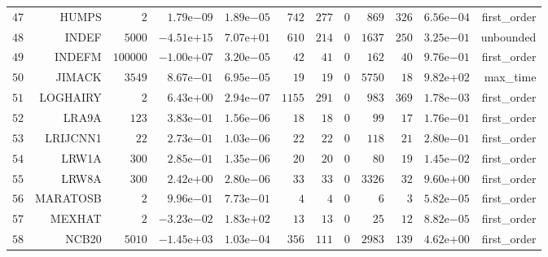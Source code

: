 \begin{longtable}{rrrrrrrrrrrr}
  \(    47\) & HUMPS & \(     2\) & \( 1.79\)e\(-09\) & \( 1.89\)e\(-05\) & \(   742\) & \(   277\) & \(     0\) & \(   869\) & \(   326\) & \( 6.56\)e\(-04\) & first\_order \\
  \(    48\) & INDEF & \(  5000\) & \(-4.51\)e\(+15\) & \( 7.07\)e\(+01\) & \(   610\) & \(   214\) & \(     0\) & \(  1637\) & \(   250\) & \( 3.25\)e\(-01\) & unbounded \\
  \(    49\) & INDEFM & \(100000\) & \(-1.00\)e\(+07\) & \( 3.20\)e\(-05\) & \(    42\) & \(    41\) & \(     0\) & \(   162\) & \(    40\) & \( 9.76\)e\(-01\) & first\_order \\
  \(    50\) & JIMACK & \(  3549\) & \( 8.67\)e\(-01\) & \( 6.95\)e\(-05\) & \(    19\) & \(    19\) & \(     0\) & \(  5750\) & \(    18\) & \( 9.82\)e\(+02\) & max\_time \\
  \(    51\) & LOGHAIRY & \(     2\) & \( 6.43\)e\(+00\) & \( 2.94\)e\(-07\) & \(  1155\) & \(   291\) & \(     0\) & \(   983\) & \(   369\) & \( 1.78\)e\(-03\) & first\_order \\
  \(    52\) & LRA9A & \(   123\) & \( 3.83\)e\(-01\) & \( 1.56\)e\(-06\) & \(    18\) & \(    18\) & \(     0\) & \(    99\) & \(    17\) & \( 1.76\)e\(-01\) & first\_order \\
  \(    53\) & LRIJCNN1 & \(    22\) & \( 2.73\)e\(-01\) & \( 1.03\)e\(-06\) & \(    22\) & \(    22\) & \(     0\) & \(   118\) & \(    21\) & \( 2.80\)e\(-01\) & first\_order \\
  \(    54\) & LRW1A & \(   300\) & \( 2.85\)e\(-01\) & \( 1.35\)e\(-06\) & \(    20\) & \(    20\) & \(     0\) & \(    80\) & \(    19\) & \( 1.45\)e\(-02\) & first\_order \\
  \(    55\) & LRW8A & \(   300\) & \( 2.42\)e\(+00\) & \( 2.80\)e\(-06\) & \(    33\) & \(    33\) & \(     0\) & \(  3326\) & \(    32\) & \( 9.60\)e\(+00\) & first\_order \\
  \(    56\) & MARATOSB & \(     2\) & \( 9.96\)e\(-01\) & \( 7.73\)e\(-01\) & \(     4\) & \(     4\) & \(     0\) & \(     6\) & \(     3\) & \( 5.82\)e\(-05\) & first\_order \\
  \(    57\) & MEXHAT & \(     2\) & \(-3.23\)e\(-02\) & \( 1.83\)e\(+02\) & \(    13\) & \(    13\) & \(     0\) & \(    25\) & \(    12\) & \( 8.82\)e\(-05\) & first\_order \\
  \(    58\) & NCB20 & \(  5010\) & \(-1.45\)e\(+03\) & \( 1.03\)e\(-04\) & \(   356\) & \(   111\) & \(     0\) & \(  2983\) & \(   139\) & \( 4.62\)e\(+00\) & first\_order \\

\end{longtable}
